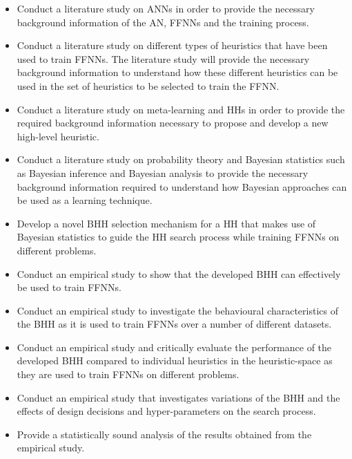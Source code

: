\begin{itemize}
      \item Conduct a literature study on \acp{ANN} in order to provide the necessary background information of the \ac{AN}, \acp{FFNN} and the training process.

      \item Conduct a literature study on different types of heuristics that have been used to train \acp{FFNN}. The literature study will provide the necessary background information to understand how these different heuristics can be used in the set of heuristics to be selected to train the \ac{FFNN}.

      \item Conduct a literature study on meta-learning and \acp{HH} in order to provide the required background information necessary to propose and develop a new high-level heuristic.

      \item Conduct a literature study on probability theory and Bayesian statistics such as Bayesian inference and Bayesian analysis to provide the necessary background information required to understand how Bayesian approaches can be used as a learning technique.

      \item Develop a novel \Ac{BHH} selection mechanism for a \ac{HH} that makes use of Bayesian statistics to guide the \ac{HH} search process while training \acp{FFNN} on different problems.

      \item Conduct an empirical study to show that the developed \Ac{BHH} can effectively be used to train \acp{FFNN}.

      \item Conduct an empirical study to investigate the behavioural characteristics of the \ac{BHH} as it is used to train \acp{FFNN} over a number of different datasets.

      \item Conduct an empirical study and critically evaluate the performance of the developed \Ac{BHH} compared to individual heuristics in the heuristic-space as they are used to train \acp{FFNN} on different problems.

      \item Conduct an empirical study that investigates variations of the \Ac{BHH} and the effects of design decisions and hyper-parameters on the search process.

      \item Provide a statistically sound analysis of the results obtained from the empirical study.
\end{itemize}

